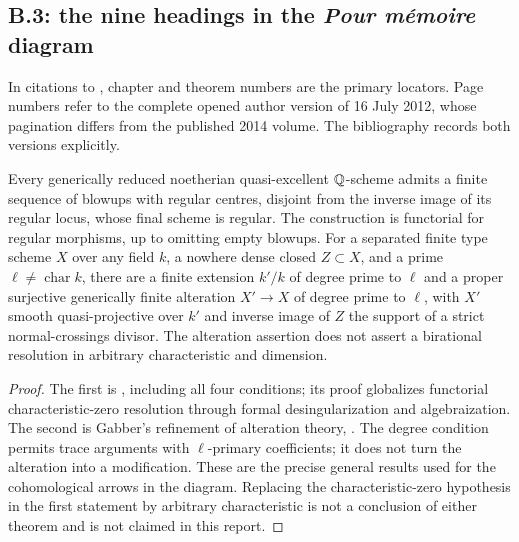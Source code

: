 \subsection{B.3: the nine headings in the \emph{Pour m\'emoire} diagram}

In citations to \cite{BILO2014}, chapter and theorem numbers are
the primary locators. Page numbers refer to the complete opened
author version of 16 July 2012, whose pagination differs from the
published 2014 volume. The bibliography records both versions
explicitly.

\begin{theorem}\label{thm:B3-resolution}
Every generically reduced noetherian quasi-excellent ${\mathbb{Q}}$-scheme
admits a finite sequence of blowups with regular centres, disjoint
from the inverse image of its regular locus, whose final scheme is
regular. The construction is functorial for regular morphisms, up to
omitting empty blowups.
For a separated finite type scheme $X$ over any field $k$, a nowhere
dense closed $Z\subset X$, and a prime $\ell\ne\operatorname{char}k$,
there are a finite extension $k'/k$ of degree prime to $\ell$ and a
proper surjective generically finite alteration $X'\to X$ of degree
prime to $\ell$, with $X'$ smooth quasi-projective over $k'$ and
inverse image of $Z$ the support of a strict normal-crossings divisor.
The alteration assertion does not assert a birational resolution in
arbitrary characteristic and dimension.
\end{theorem}
\begin{proof}
The first is \cite[Theorem 1.2.1]{BTemkin2012}, including all four
conditions; its proof globalizes functorial characteristic-zero
resolution through formal desingularization and algebraization.
The second is Gabber's refinement of alteration theory,
\cite[Introduction, Theorem 3(1), and Expos\'e X, Theorem 2.1]{BILO2014}.
The degree condition permits trace arguments with $\ell$-primary
coefficients; it does not turn the alteration into a modification.
These are the precise general results used for the cohomological
arrows in the diagram. Replacing the characteristic-zero hypothesis
in the first statement by arbitrary characteristic is not a conclusion
of either theorem and is not claimed in this report.
\end{proof}

